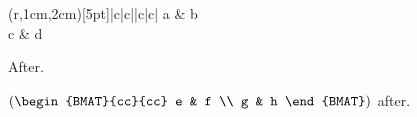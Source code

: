 \documentclass{article}
\begin{document}
\begin{TAB}(r,1cm,2cm)[5pt]{|c|c|}{|c|c|}
a & b \\
c & d \\
\end{TAB}
After.

$\left(\begin{BMAT}{cc}{cc} e & f \\ g & h \end{BMAT}\right)$ after.
\end{document}
